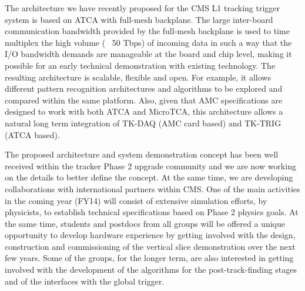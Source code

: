 \noindent The architecture we have recently proposed for the CMS L1 tracking trigger system is based on ATCA with full-mesh backplane. The large inter-board communication bandwidth provided by the full-mesh backplane is used to time multiplex the high volume (~ 50 Tbps) of incoming data in such a way that the I/O bandwidth demands are manageable at the board and chip level, making it possible for an early technical demonstration with existing technology. The resulting architecture is scalable, flexible and open. For example, it allows different pattern recognition architectures and algorithms to be explored and compared within the same platform. Also, given that AMC specifications are designed to work with both ATCA and MicroTCA, this architecture allows a natural long term integration of TK-DAQ (AMC card based) and TK-TRIG (ATCA based).

\noindent The proposed architecture and system demonstration concept has been well received within the tracker Phase 2 upgrade community and we are now working on the details to better define the concept.  At the same time, we are developing collaborations with international partners within CMS. One of the main activities in the coming year (FY14) will consist of extensive simulation efforts, by physicists, to establish technical specifications based on Phase 2 physics goals. At the same time, students and postdocs from all groups will be offered a unique opportunity to develop hardware experience by getting involved with the design, construction and commissioning of the vertical slice demonstration over the next few years. Some of the groups, for the longer term, are also interested in getting involved with the development of the algorithms for the post-track-finding stages and of the interfaces with the global trigger. 



\clearpage
